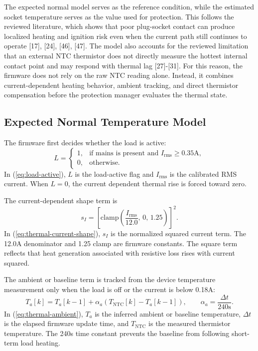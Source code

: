 The expected normal model serves as the reference condition, while the
estimated socket temperature serves as the value used for protection. This
follows the reviewed literature, which shows that poor plug-socket contact can
produce localized heating and ignition risk even when the current path still
continues to operate [17], [24], [46], [47]. The model also accounts for the
reviewed limitation that an external NTC thermistor does not directly measure
the hottest internal contact point and may respond with thermal lag [27]-[31].
For this reason, the firmware does not rely on the raw NTC reading alone.
Instead, it combines current-dependent heating behavior, ambient tracking, and
direct thermistor compensation before the protection manager evaluates the
thermal state.

\subsection{Expected Normal Temperature Model}
\label{sec:ch3-expected-normal-temperature}

The firmware first decides whether the load is active:
\begin{equation}
  L =
  \begin{cases}
  1, & \text{if mains is present and } I_{\mathrm{rms}}\geq 0.35\mathrm{A},\\
  0, & \text{otherwise}.
  \end{cases}
  \label{eq:load-active}
\end{equation}
In (\ref{eq:load-active}), $L$ is the load-active flag and
$I_{\mathrm{rms}}$ is the calibrated RMS current. When $L=0$, the current
dependent thermal rise is forced toward zero.

The current-dependent shape term is
\begin{equation}
  s_I =
  \left[
  \mathrm{clamp}\left(\frac{I_{\mathrm{rms}}}{12.0},\,0,\,1.25\right)
  \right]^2 .
  \label{eq:thermal-current-shape}
\end{equation}
In (\ref{eq:thermal-current-shape}), $s_I$ is the normalized squared current
term. The 12.0A denominator and 1.25 clamp are firmware constants. The square
term reflects that heat generation associated with resistive loss rises with
current squared.

The ambient or baseline term is tracked from the device temperature measurement only when the
load is off or the current is below 0.18A:
\begin{equation}
  T_a[k] = T_a[k-1] + \alpha_a\left(T_{\mathrm{NTC}}[k] - T_a[k-1]\right),
  \qquad
  \alpha_a = \frac{\Delta t}{240\mathrm{s}} .
  \label{eq:thermal-ambient}
\end{equation}
In (\ref{eq:thermal-ambient}), $T_a$ is the inferred ambient or baseline
temperature, $\Delta t$ is the elapsed firmware update time, and
$T_{\mathrm{NTC}}$ is the measured thermistor temperature. The 240s time
constant prevents the baseline from following short-term load heating.

